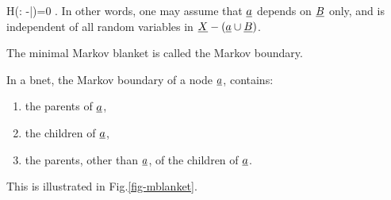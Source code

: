 \beq
H(\rva: \rvX-\rva|\rvB)=0
\;.
\eeq
In other words, one may assume that
${\underline{a}}$ depends on ${\underline{B}}$ only, 
and is independent of all random
variables in ${\underline{X}}-({\underline{a}}\cup{\underline{B}})$.

The minimal Markov blanket 
is called the Markov boundary.

In a bnet, the Markov boundary
of a node ${\underline{a}}$,
contains:
\begin{enumerate}
\item
the parents of ${\underline{a}}$,
\item
the children of ${\underline{a}}$,
\item
the parents, other than ${\underline{a}}$,
of the children of ${\underline{a}}$.
\end{enumerate}
This is illustrated in 
Fig.\ref{fig-mblanket}.